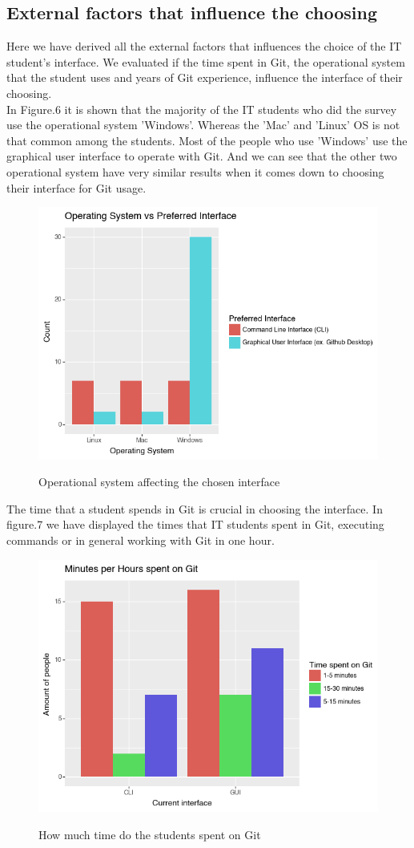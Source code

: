 \documentclass[]{report}
\begin{document}
	\subsection{External factors that influence the choosing }
	Here we have derived all the external factors that influences the choice of the IT student's interface.  We evaluated if the time spent in Git, the operational system that the student uses and years of Git experience, influence the interface of their choosing.\\
	
	In Figure.6 it is shown that the majority of the IT students who did the survey use the operational system 'Windows'. Whereas the 'Mac' and 'Linux' OS is not that common among the students. Most of the people who use 'Windows' use the graphical user interface to operate with Git. And we can see that the other two operational system have very similar results when it comes down to choosing their interface for Git usage.
	
		\begin{figure}[H]
			\centering
			\includegraphics[width=0.75\linewidth]{OSAffectsInterface}\\
			\caption{Operational system affecting the chosen interface}
			\label{fig: 6}
		\end{figure}
		
		The time that a student spends in Git is crucial in choosing the interface. In figure.7 we have displayed the times that IT students spent in Git, executing commands or in general working with Git in one hour.
			\begin{figure}[H]
			\centering
			\includegraphics[width=0.75\linewidth]{TimeSpentGit}\\
			\caption{How much time do the students spent on Git}
			\label{fig: 7}
		\end{figure}
		
\end{document}
